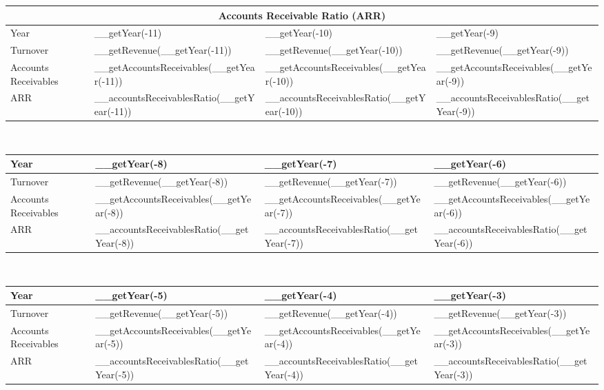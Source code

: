 \begin{tabularx}{\textwidth}{|X|X|X|X|}
 \hline
 \multicolumn{4}{|c|}{Accounts Receivable Ratio (ARR)} \\
 \hline
 Year                     & __getYear(-11)                             & __getYear(-10)                             & __getYear(-9)                             \\
 \hline
 Turnover                 & __getRevenue(__getYear(-11))               & __getRevenue(__getYear(-10))               & __getRevenue(__getYear(-9))               \\
 Accounts Receivables     & __getAccountsReceivables(__getYear(-11))   & __getAccountsReceivables(__getYear(-10))   & __getAccountsReceivables(__getYear(-9))   \\
 \rowcolor{lightgray} ARR & __accountsReceivablesRatio(__getYear(-11)) & __accountsReceivablesRatio(__getYear(-10)) & __accountsReceivablesRatio(__getYear(-9)) \\
 \hline
\end{tabularx}\\

\begin{tabularx}{\textwidth}{|X|X|X|X|}
 \hline
 Year                     & __getYear(-8)                             & __getYear(-7)                             & __getYear(-6)                             \\
 \hline
 Turnover                 & __getRevenue(__getYear(-8))               & __getRevenue(__getYear(-7))               & __getRevenue(__getYear(-6))               \\
 Accounts Receivables     & __getAccountsReceivables(__getYear(-8))   & __getAccountsReceivables(__getYear(-7))   & __getAccountsReceivables(__getYear(-6))   \\
 \rowcolor{lightgray} ARR & __accountsReceivablesRatio(__getYear(-8)) & __accountsReceivablesRatio(__getYear(-7)) & __accountsReceivablesRatio(__getYear(-6)) \\
 \hline
\end{tabularx}\\

\begin{tabularx}{\textwidth}{|X|X|X|X|}
 \hline
 Year                     & __getYear(-5)                             & __getYear(-4)                             & __getYear(-3)                             \\
 \hline
 Turnover                 & __getRevenue(__getYear(-5))               & __getRevenue(__getYear(-4))               & __getRevenue(__getYear(-3))               \\
 Accounts Receivables     & __getAccountsReceivables(__getYear(-5))   & __getAccountsReceivables(__getYear(-4))   & __getAccountsReceivables(__getYear(-3))   \\
 \rowcolor{lightgray} ARR & __accountsReceivablesRatio(__getYear(-5)) & __accountsReceivablesRatio(__getYear(-4)) & __accountsReceivablesRatio(__getYear(-3)) \\
 \hline
\end{tabularx}\\

